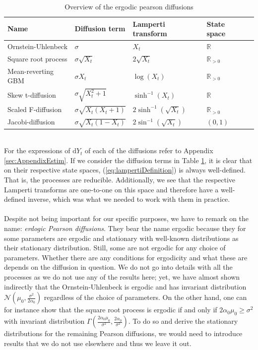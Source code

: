 \begin{table}[h!]
    \begin{center}
    \begin{tabular}{lllll}\hline
    \textbf{Name} & \textbf{Diffusion term} & \textbf{Lamperti transform} & \textbf{State space}\\ \hline
    Ornstein-Uhlenbeck  & $\sigma$  & $X_t$ & $\mathbb{R}$ \\
    Square root process & $\sigma\sqrt{X_t}$  & $ 2\sqrt{X_t}$ & $\mathbb{R}_{>0}$ \\
    Mean-reverting GBM  & $\sigma X_t $  & $ \log\left(X_t\right)$  & $\mathbb{R}_{>0}$ \\
    Skew t-diffusion  & $\sigma\sqrt{X_t^2 + 1}$  & $ \sinh^{-1}(X_t)$ & $\mathbb{R}$\\
    Scaled F-diffusion  & $\sigma\sqrt{X_t\left(X_t + 1\right)}$  & $ 2\sinh^{-1}\left(\sqrt{X_t}\right)$ & $\mathbb{R}_{>0}$ \\
    Jacobi-diffusion  & $\sigma\sqrt{X_t\left(1 - X_t\right)}$  & $ 2\sin^{-1}\left(\sqrt{X_t}\right)$ & $(0, 1)$ \\ \hline
    \end{tabular}
    \caption{Overview of the ergodic pearson diffusions}
    \label{table:ergodicDiffusions}
\end{center}
\end{table}\\
For the expressions of $\mathrm{d}Y_t$ of each of the diffusions refer to Appendix \ref{sec:AppendixEstim}. If we consider the diffusion terms in Table \ref{table:ergodicDiffusions}, it is clear that on their respective state spaces, (\ref{eq:lampertiDefinition}) is always well-defined. That is, the processes are reducible. Additionally, we see that the respective Lamperti transforms are one-to-one on this space and therefore have a well-defined inverse, which was what we needed to work with them in practice. \\\\
Despite not being important for our specific purposes, we have to remark on the name: \textit{erdogic Pearson diffusions}. They bear the name ergodic because they for some parameters are ergodic and stationary with well-known distributions as their stationary distribution. Still, some are not ergodic for any choice of parameters. Whether there are any conditions for ergodicity and what these are depends on the diffusion in question. We do not go into details with all the processes as we do not use any of the results here; yet, we have almost shown indirectly that the Ornstein-Uhlenbeck is ergodic and has invariant distribution $\mathcal{N}\left(\mu_0, \frac{\sigma^2}{2\alpha_0}\right)$ regardless of the choice of parameters. On the other hand, one can for instance show that the square root process is ergodic if and only if $2\alpha_0\mu_0\geq \sigma^2$ with invariant distribution $\Gamma\left(\frac{2\alpha_0\mu_0}{\sigma^2}, \frac{2\alpha_0}{\sigma^2}\right)$. To do so and derive the stationary distributions for the remaining Pearson diffusions, we would need to introduce results that we do not use elsewhere and thus we leave it out. 

